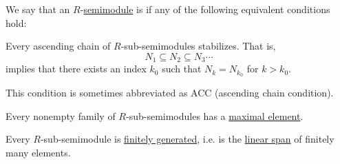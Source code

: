 \begin{definition}\label{def:noetherian_semimodule}
  We say that an \( R \)-\hyperref[def:semimodule]{semimodule} is  if any of the following equivalent conditions hold:
  \begin{thmenum}
     Every ascending chain of \( R \)-sub-semimodules stabilizes. That is,
    \begin{equation*}
      N_1 \subseteq N_2 \subseteq N_3 \cdots
    \end{equation*}
    implies that there exists an index \( k_0 \) such that \( N_k = N_{k_0} \) for \( k > k_0 \).

    This condition is sometimes abbreviated as ACC (ascending chain condition).

     Every nonempty family of \( R \)-sub-semimodules has a \hyperref[def:partially_ordered_set_extremal_points/maximal_and_minimal_element]{maximal element}.

     Every \( R \)-sub-semimodule is \hyperref[def:module_presentation]{finitely generated}, i.e. is the \hyperref[def:semimodule/submodel]{linear span} of finitely many elements.
  \end{thmenum}
\end{definition}
